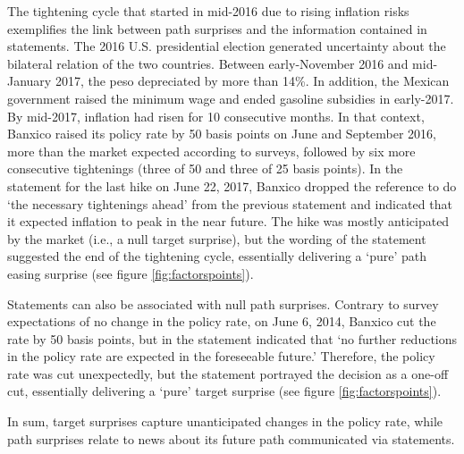 {The tightening cycle that started in mid-2016 due to rising inflation risks exemplifies the link between path surprises and the information contained in statements. 
The 2016 U.S. presidential election generated uncertainty about the bilateral relation of the two countries. Between early-November 2016 and mid-January 2017, the peso depreciated by more than 14\%. 
In addition, the Mexican government raised the minimum wage and ended gasoline subsidies in early-2017. By mid-2017, inflation had risen for 10 consecutive months. %
In that context, Banxico raised its policy rate by 50 basis points on June and September 2016, more than the market expected according to surveys, followed by six more consecutive tightenings (three of 50 and three of 25 basis points). %
In the statement for the last hike on June 22, 2017, Banxico dropped the reference to do `the necessary tightenings ahead' from the previous statement and indicated that it expected inflation to peak in the near future. The hike was mostly anticipated by the market (i.e., a null target surprise), but the wording of the statement suggested the end of the tightening cycle, essentially delivering a `pure' path easing surprise (see figure \ref{fig:factorspoints}).

Statements can also be associated with null path surprises. 
Contrary to survey expectations of no change in the policy rate, on June 6, 2014, Banxico cut the rate by 50 basis points, but in the statement indicated that `no further reductions in the policy rate are expected in the foreseeable future.' Therefore, the policy rate was cut unexpectedly, but the statement portrayed the decision as a one-off cut, essentially delivering a `pure' target surprise (see figure \ref{fig:factorspoints}). %

In sum, target surprises capture unanticipated changes in the policy rate, while path surprises relate to news about its future path communicated via statements. 


}
